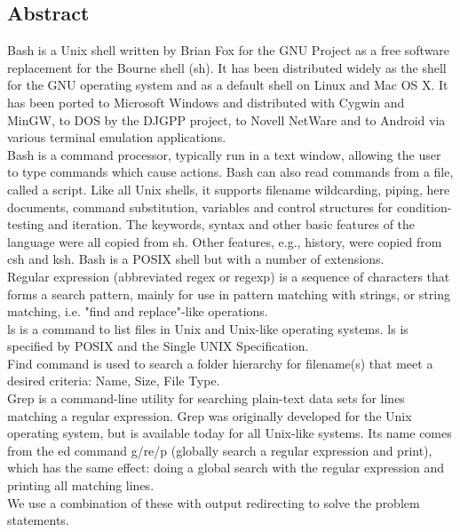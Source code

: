 \documentclass[paper=a4, fontsize=11pt]{scrartcl} %
\numberwithin{equation}{section} %
\numberwithin{figure}{section} %
\numberwithin{table}{section} %
\begin{document}
\subsection{Abstract}

Bash is a Unix shell written by Brian Fox for the GNU Project as a free software replacement for the Bourne shell (sh). It has been distributed widely as the shell for the GNU operating system and as a default shell on Linux and Mac OS X. It has been ported to Microsoft Windows and distributed with Cygwin and MinGW, to DOS by the DJGPP project, to Novell NetWare and to Android via various terminal emulation applications.\\

Bash is a command processor, typically run in a text window, allowing the user to type commands which cause actions. Bash can also read commands from a file, called a script. Like all Unix shells, it supports filename wildcarding, piping, here documents, command substitution, variables and control structures for condition-testing and iteration. The keywords, syntax and other basic features of the language were all copied from sh. Other features, e.g., history, were copied from csh and ksh. Bash is a POSIX shell but with a number of extensions.\\

Regular expression (abbreviated regex or regexp) is a sequence of characters that forms a search pattern, mainly for use in pattern matching with strings, or string matching, i.e. "find and replace"-like operations.\\

ls is a command to list files in Unix and Unix-like operating systems. ls is specified by POSIX and the Single UNIX Specification.\\

Find command is used to search a folder hierarchy for filename(s) that meet a desired criteria: Name, Size, File Type.\\

Grep is a command-line utility for searching plain-text data sets for lines matching a regular expression. Grep was originally developed for the Unix operating system, but is available today for all Unix-like systems. Its name comes from the ed command g/re/p (globally search a regular expression and print), which has the same effect: doing a global search with the regular expression and printing all matching lines.\\

We use a combination of these with output redirecting to solve the problem statements.\\
\end{document}
